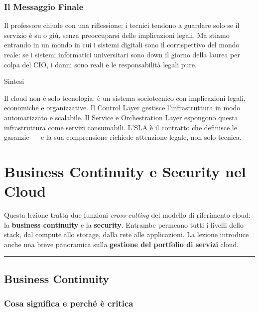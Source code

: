 \documentclass[
  italian,
  openany]{book}
\begin{document}
\subsection{Il Messaggio Finale}\label{il-messaggio-finale}

Il professore chiude con una riflessione: i tecnici tendono a guardare
solo se il servizio è su o giù, senza preoccuparsi delle implicazioni
legali. Ma stiamo entrando in un mondo in cui i sistemi digitali sono il
corrispettivo del mondo reale: se i sistemi informatici universitari
sono down il giorno della laurea per colpa del CIO, i danni sono reali e
le responsabilità legali pure.

\begin{calloutnote}{Sintesi}

Il cloud non è solo tecnologia: è un sistema sociotecnico con
implicazioni legali, economiche e organizzative. Il Control Layer
gestisce l'infrastruttura in modo automatizzato e scalabile. Il Service
e Orchestration Layer espongono questa infrastruttura come servizi
consumabili. L'SLA è il contratto che definisce le garanzie --- e la sua
comprensione richiede attenzione legale, non solo tecnica.

\end{calloutnote}

\newpage

\chapter{Business Continuity e Security nel
Cloud}\label{business-continuity-e-security-nel-cloud}

Questa lezione tratta due funzioni \emph{cross-cutting} del modello di
riferimento cloud: la \textbf{business continuity} e la
\textbf{security}. Entrambe permeano tutti i livelli dello stack, dal
compute allo storage, dalla rete alle applicazioni. La lezione introduce
anche una breve panoramica sulla \textbf{gestione del portfolio di
servizi} cloud.

\begin{center}\rule{0.5\linewidth}{0.5pt}\end{center}

\section{Business Continuity}\label{business-continuity}

\subsection{Cosa significa e perché è
critica}\label{cosa-significa-e-perchuxe9-uxe8-critica}
\end{document}
